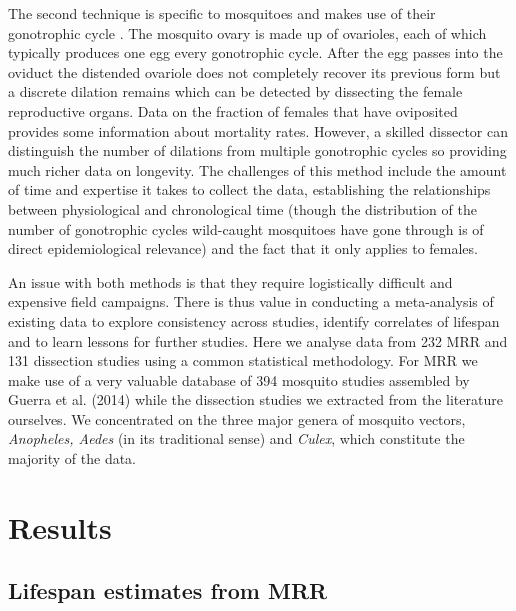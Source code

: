\documentclass[]{article}
\begin{document}
The second technique is specific to mosquitoes and makes use of their
gonotrophic cycle \citep{polovodova1949determination,detinova1962age}. The mosquito ovary is made up of ovarioles, each of
which typically produces one egg every gonotrophic cycle. After the egg
passes into the oviduct the distended ovariole does not completely
recover its previous form but a discrete dilation remains which can be
detected by dissecting the female reproductive organs. Data on the
fraction of females that have oviposited provides some information about
mortality rates. However, a skilled dissector can distinguish the number
of dilations from multiple gonotrophic cycles so providing much richer
data on longevity. The challenges of this method include the amount of
time and expertise it takes to collect the data, establishing the
relationships between physiological and chronological time (though the
distribution of the number of gonotrophic cycles wild-caught mosquitoes
have gone through is of direct epidemiological relevance) and the fact
that it only applies to females.

An issue with both methods is that they require logistically difficult
and expensive field campaigns. There is thus value in conducting a
meta-analysis of existing data to explore consistency across studies,
identify correlates of lifespan and to learn lessons for further
studies. Here we analyse data from 232 MRR and 131 dissection studies
using a common statistical methodology. For MRR we make use of a very
valuable database of 394 mosquito studies assembled by Guerra et al.
(2014) while the dissection studies we extracted from the literature
ourselves. We concentrated on the three major genera of mosquito
vectors, \emph{Anopheles, Aedes} (in its traditional sense) and
\emph{Culex}, which constitute the majority of the data.


\section{Results}\label{results}

\subsection{Lifespan estimates from
MRR}\label{lifespan-estimates-from-mrr}
\end{document}

